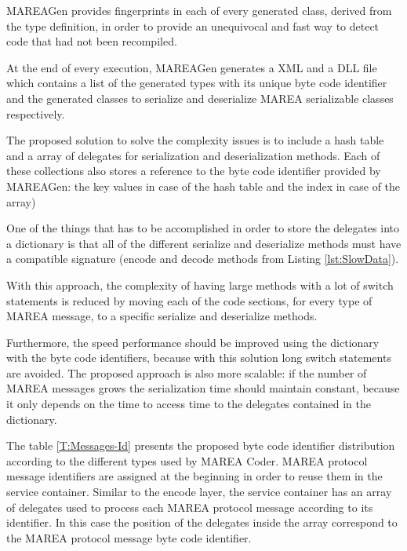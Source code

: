 MAREAGen provides fingerprints in each of every generated class, derived from the type definition, in order to provide an unequivocal and fast way to detect code that had not been recompiled. 

At the end of every execution, MAREAGen generates a XML and a DLL file which contains a list of the generated types with its unique byte code identifier and the generated classes to serialize and deserialize MAREA serializable classes respectively.

The proposed solution to solve the complexity issues is to include a hash table and a array of delegates for serialization and deserialization methods. Each of these collections also stores a reference to the byte code identifier provided by MAREAGen: the key values in case of the hash table and the index in case of the array)

One of the things that has to be accomplished in order to store the delegates into a dictionary is that all of the different serialize and deserialize methods must have a compatible signature (encode and decode methods from Listing \ref{lst:SlowData}).

With this approach, the complexity of having large methods with a lot of switch statements is reduced by moving each of the code sections, for every type of MAREA message, to a specific serialize and deserialize methods. 

Furthermore, the speed performance should be improved using the dictionary with the byte code identifiers, because with this solution long switch statements are avoided. The proposed approach is also more scalable: if the number of MAREA messages grows the serialization time should maintain constant, because it only depends on the time to access time to the delegates contained in the dictionary.

The table \ref{T:Messages-Id} presents the proposed byte code identifier distribution according to the different types used by MAREA Coder. MAREA protocol message identifiers are assigned at the beginning in order to reuse them in the service container. Similar to the encode layer, the service container has an array of delegates used to process each MAREA protocol message according to its identifier. In this case the position of the delegates inside the array correspond to the MAREA protocol message byte code identifier.

